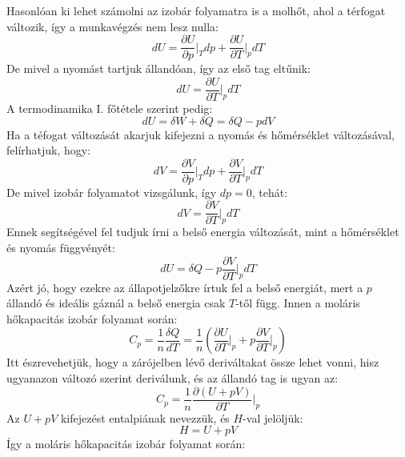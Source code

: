 \documentclass[a4paper,12pt]{article}
\begin{document}
Hasonlóan ki lehet számolni az izobár folyamatra is a molhőt, ahol a térfogat változik, így a munkavégzés nem lesz nulla:
\begin{equation}
    dU = \frac{\partial U}{\partial p}\bigg|_{T} dp + \frac{\partial U}{\partial T}\bigg|_{p} dT
\end{equation}
De mivel a nyomást tartjuk állandóan, így az első tag eltűnik:
\begin{equation}
    dU = \frac{\partial U}{\partial T}\bigg|_{p} dT
\end{equation}
A termodinamika I. főtétele szerint pedig:
\begin{equation}
    dU = \delta W + \delta Q = \delta Q - p dV
\end{equation}
Ha a téfogat változását akarjuk kifejezni a nyomás és hőmérséklet változásával, felírhatjuk, hogy:
\begin{equation}
    dV = \frac{\partial V}{\partial p}\bigg|_{T} dp + \frac{\partial V}{\partial T}\bigg|_{p} dT
\end{equation}
De mivel izobár folyamatot vizsgálunk, így $dp = 0$, tehát:
\begin{equation}
    dV = \frac{\partial V}{\partial T}\bigg|_{p} dT
\end{equation}
Ennek segítségével fel tudjuk írni a belső energia változását, mint a hőmérséklet és nyomás függvényét:
\begin{equation}
    dU = \delta Q - p \frac{\partial V}{\partial T}\bigg|_{p} dT
\end{equation}
Azért jó, hogy ezekre az állapotjelzőkre írtuk fel a belső energiát, mert a $p$ állandó és ideális gáznál a belső energia csak $T$-től függ.
Innen a moláris hőkapacitás izobár folyamat során:
\begin{equation}
    C_p = \frac{1}{n} \frac{\delta Q}{dT} = \frac{1}{n} \left(\frac{\partial U}{\partial T}\bigg|_{p} + p \frac{\partial V}{\partial T}\big|_{p}\right)
\end{equation}
Itt észrevehetjük, hogy a zárójelben lévő deriváltakat össze lehet vonni, hisz ugyanazon változó szerint deriválunk, és az állandó tag is ugyan az:
\begin{equation}
    C_p = \frac{1}{n} \frac{\partial \left(U + pV\right)}{\partial T}\bigg|_{p}
\end{equation}
Az $U + pV$ kifejezést entalpiának nevezzük, és $H$-val jelöljük:
\begin{equation}
    H = U + pV
\end{equation}
Így a moláris hőkapacitás izobár folyamat során:
\end{document}
